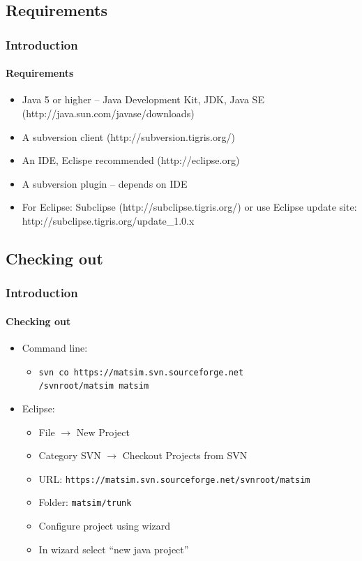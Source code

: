 \subsection{Requirements}

\begin{frame}
\frametitle{Introduction}
\framesubtitle{Requirements}

\begin{itemize}
  \item Java 5 or higher -- Java Development Kit, JDK, Java SE (http://java.sun.com/javase/downloads)
  \item A subversion client (http://subversion.tigris.org/)
  \item An IDE, Eclispe recommended (http://eclipse.org)
  \item A subversion plugin -- depends on IDE
  \item For Eclipse: Subclipse (http://subclipse.tigris.org/) or use Eclipse update site: http://subclipse.tigris.org/update\_1.0.x
\end{itemize}
\end{frame}


\subsection{Checking out}

\begin{frame}[fragile]
\frametitle{Introduction}
\framesubtitle{Checking out}
\begin{itemize}
  \item Command line:
\begin{itemize}
  \item \verb|svn co https://matsim.svn.sourceforge.net| \\ \verb|/svnroot/matsim matsim|
\end{itemize}
  \item Eclipse:
  \begin{itemize}
    \item File $\rightarrow$ New Project
    \item Category SVN $\rightarrow$ Checkout Projects from SVN
    \item URL: \verb|https://matsim.svn.sourceforge.net/svnroot/matsim|
    \item Folder: \verb|matsim/trunk|
    \item Configure project using wizard
    \item In wizard select ``new java project''
  \end{itemize}
\end{itemize}


\end{frame}